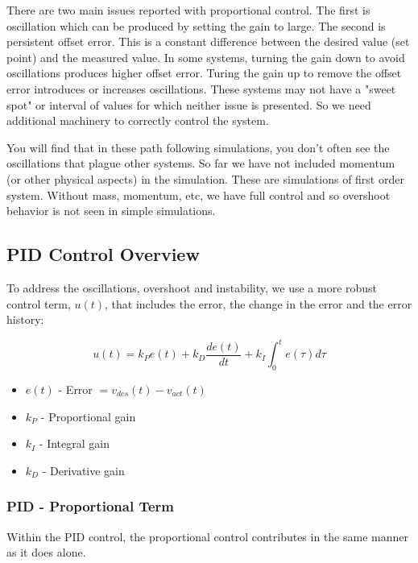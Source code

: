 There are two main issues reported with proportional control. The first
is oscillation which can be produced by setting the gain to large. The
second is persistent offset error. This is a constant difference between
the desired value (set point) and the measured value. In some systems,
turning the gain down to avoid oscillations produces higher offset
error. Turing the gain up to remove the offset error introduces or
increases oscillations. These systems may not have a "sweet spot" or
interval of values for which neither issue is presented. So we need
additional machinery to correctly control the system.

You will find that in these path following simulations, you don't often
see the oscillations that plague other systems. So far we have not
included momentum (or other physical aspects) in the simulation. These
are simulations of first order system. Without mass, momentum, etc, we
have full control and so overshoot behavior is not seen in simple
simulations.

\hypertarget{pid-control-overview}{%
\subsection{PID Control Overview}\label{pid-control-overview}}

To address the oscillations, overshoot and instability, we use a more
robust control term, \(u(t)\), that includes the error, the change in
the error and the error history:

\[u(t) = k_P  e(t)  + k_D \frac{de(t)}{dt}  + k_I \int_0^t e(\tau)d\tau\]

\begin{itemize}
\tightlist
\item
  \(e(t)\) - Error \(=v_{des}(t) - v_{act}(t)\)
\item
  \(k_P\) - Proportional gain
\item
  \(k_I\) - Integral gain
\item
  \(k_D\) - Derivative gain
\end{itemize}

\hypertarget{pid---proportional-term}{%
\subsubsection{PID - Proportional Term}\label{pid---proportional-term}}

Within the PID control, the proportional control contributes in the same
manner as it does alone.

